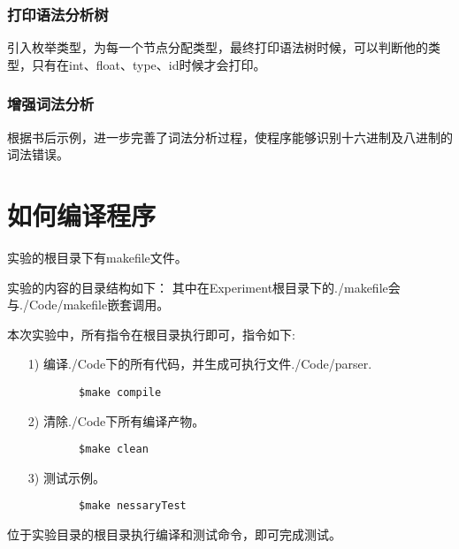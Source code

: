 \documentclass[UTF8]{ctexart}
\begin{document}
\subsubsection{打印语法分析树}
引入枚举类型，为每一个节点分配类型，最终打印语法树时候，可以判断他的类型，只有在int、float、type、id时候才会打印。
\subsubsection{增强词法分析}
根据书后示例，进一步完善了词法分析过程，使程序能够识别十六进制及八进制的词法错误。



\section{如何编译程序}



实验的根目录下有makefile文件。\par
实验的内容的目录结构如下：
其中在Experiment根目录下的./makefile会与./Code/makefile嵌套调用。\par
本次实验中，所有指令在根目录执行即可，指令如下:\par
\begin{itemize}
    \item [1)] 
    编译./Code下的所有代码，并生成可执行文件./Code/parser.
    \lstset{language=bash}
    \begin{lstlisting}
        $make compile
    \end{lstlisting} 
    \item [2)] 
    清除./Code下所有编译产物。
    \lstset{language=bash}
    \begin{lstlisting}
        $make clean
    \end{lstlisting} 
    \item [3)] 
    测试示例。
    \lstset{language=bash}
    \begin{lstlisting}
        $make nessaryTest
    \end{lstlisting} 
\end{itemize}
位于实验目录的根目录执行编译和测试命令，即可完成测试。
\end{document}
